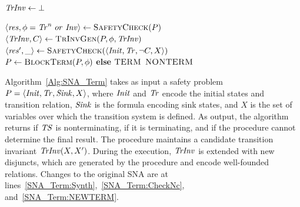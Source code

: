\begin{algorithm}[t!]
	\SetInd{0.5em}{0.5em}
    \DontPrintSemicolon
    \small
    \newcommand{\Continue}{\textbf{continue}}
    \caption{Interpolation-based Transition Invariant Generation for Proving and Disproving Termination.}
    \label{Alg:SNA_Term}
    \Output{\TERM $\mid$ \NONTERM $\mid$ \UNKNOWN}
    $\mathit{TrInv} \gets \bot$ \\
    \While{$\top$} {
        $\langle \mathit{res}, \phi = \mathit{Tr}^n\ or\ \mathit{Inv} \rangle \gets \textsc{SafetyCheck}(P)$ \label{SNA_Term:Safety}\\
        \eIf{$\res = \UNSAFE$} {
            $\langle \mathit{TrInv}, C \rangle \gets \textsc{TrInvGen}(P, \phi, \mathit{TrInv})$ \label{SNA_Term:Synth} \\
            $\langle \mathit{res}', \_ \rangle \gets \textsc{SafetyCheck}(\langle \mathit{Init}, \mathit{Tr}, \lnot C, X \rangle)$ \label{SNA_Term:CheckNc} \\
             {%
                $P \gets \textsc{BlockTerm}(P, \phi)$\label{SNA_Term:BlockTerm}
            }
            \textbf{else} \Return $\textsc{TERM}$\label{SNA_Term:NEWTERM}
        }{
             {
                \Return $\textsc{NONTERM}$ \label{SNA_Term:NONTERM}
            }
            \Return \UNKNOWN
        }
        
    }
\end{algorithm}


Algorithm~\ref{Alg:SNA_Term} takes as input a safety problem $P=\langle \mathit{Init}, \mathit{Tr}, \mathit{Sink}, X \rangle$, where $\mathit{Init}$ and 
$\mathit{Tr}$ encode the initial states and transition relation, $\mathit{Sink}$ is the formula encoding sink states, and $X$ is 
the set of variables over which the transition system is defined.
As output, the algorithm returns \NONTERM if $\mathit{TS}$ is nonterminating, \TERM if it is terminating, and \UNKNOWN if the procedure
cannot determine the final result.
The procedure maintains a candidate transition invariant $\mathit{TrInv}(X,X')$.
During the execution, $\mathit{TrInv}$ is extended with new disjuncts, which are generated by the \trInvSynthesis procedure and encode well-founded relations.
Changes to the original SNA are at lines~\ref{SNA_Term:Synth},~\ref{SNA_Term:CheckNc}, and~\ref{SNA_Term:NEWTERM}.

